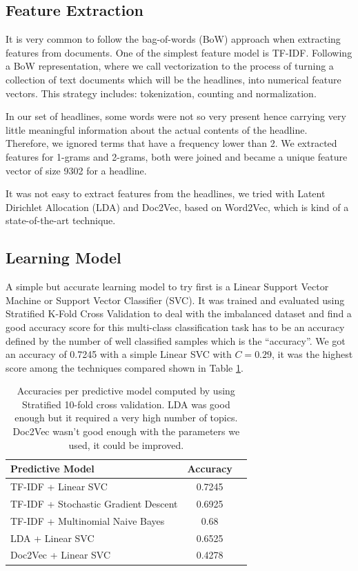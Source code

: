 \documentclass[11pt]{article}
\begin{document}
\subsection{Feature Extraction}

It is very common to follow the bag-of-words (BoW) approach when extracting features from documents. One of the simplest feature model is TF-IDF. Following a BoW representation, where we call vectorization to the process of turning a collection of text documents which will be the headlines, into numerical feature vectors. This strategy includes: tokenization, counting and normalization.

In our set of headlines, some words were not so very present hence carrying very little meaningful information about the actual contents of the headline. Therefore, we ignored terms that have a frequency lower than 2. We extracted features for 1-grams and 2-grams, both were joined and became a unique feature vector of size 9302 for a headline.

It was not easy to extract features from the headlines, we tried with Latent Dirichlet Allocation (LDA) and Doc2Vec, based on Word2Vec, which is kind of a state-of-the-art technique.

\subsection{Learning Model}

A simple but accurate learning model to try first is a Linear Support Vector Machine or Support Vector Classifier (SVC). It was trained and evaluated using Stratified K-Fold Cross Validation to deal with the imbalanced dataset and find a good accuracy score for this multi-class classification task has to be an accuracy defined by the number of well classified samples which is the ``accuracy''. We got an accuracy of 0.7245 with a simple Linear SVC with $C = 0.29$, it was the highest score among the techniques compared shown in Table \ref{tab:compares}.

\begin{table}
\centering
\scriptsize 
\caption{Accuracies per predictive model computed by using Stratified 10-fold cross validation. LDA was good enough but it required a very high number of topics. Doc2Vec wasn't good enough with the parameters we used, it could be improved.}
\label{tab:compares}
\def\arraystretch{1.5}%
 \begin{tabular}{ |>{\centering\arraybackslash}m{4cm} | c | c |}
    \hline
    \rowcolor{LightCyan} Predictive Model & Accuracy \\
    \hline
TF-IDF + Linear SVC & 0.7245\\
    \hline
TF-IDF + Stochastic Gradient Descent & 0.6925\\
    \hline
TF-IDF + Multinomial Naive Bayes & 0.68\\
    \hline
LDA + Linear SVC & 0.6525 \\
    \hline
Doc2Vec + Linear SVC & 0.4278 \\
    \hline
  \end{tabular}
\end{table}
\end{document}
